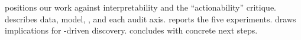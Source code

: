   positions our work against \plm interpretability and the ``actionability'' critique.  describes data, model, \sae, and each audit axis.  reports the five experiments.  draws implications for \plm-driven discovery.  concludes with concrete next steps.
